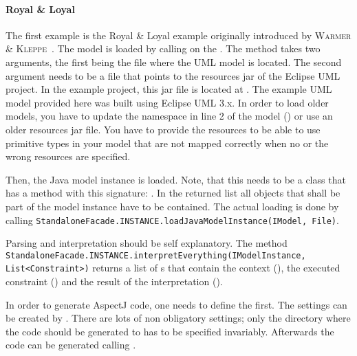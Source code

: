 \paragraph{Royal \& Loyal}
The first example is the Royal \& Loyal example originally introduced by
{\scshape Warmer \& Kleppe}~\cite{warmerEA:ocl03}. The model is loaded by
calling  on the
. The method takes two arguments, the first being
the file where the UML model is located. The second argument needs to be a file that
points to the resources jar of the Eclipse UML project. In the example project, 
this jar file is located at 
.
The example UML model provided here was built using Eclipse UML 3.x. In order to
load older models, you have to update the namespace in line 2 of the model 
() or use an older 
resources jar file. You have to provide the resources to be able to use
primitive types in your model that are not mapped correctly when no or the wrong
resources are specified.

Then, the Java model instance is loaded. Note, that this needs to be a class 
that has a method with this signature: . In the returned list all objects that shall be part of the 
model instance have to be contained. The actual loading is done by calling 
\lstinline[breaklines=true]{StandaloneFacade.INSTANCE.loadJavaModelInstance(IModel, File)}.

Parsing and interpretation should be self explanatory. The method 
\lstinline[breaklines=true]{StandaloneFacade.INSTANCE.interpretEverything(IModelInstance, List<Constraint>)} returns a list of
s that contain the context (), the executed constraint 
() and the result of the interpretation 
().

In order to generate AspectJ code, one needs to define the
 first. The settings can be created by 
. 
There are lots of non obligatory settings; only the directory where the code 
should be generated to has to be specified invariably. Afterwards the code can 
be generated calling 
.

